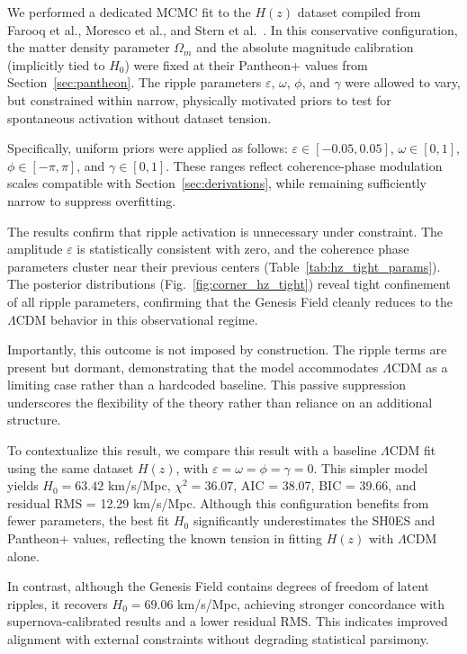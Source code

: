 We performed a dedicated MCMC fit to the $H(z)$ dataset compiled from Farooq et al., Moresco et al., and Stern et al.~\cite{Farooq2017, Moresco2016, Stern2010}. In this conservative configuration, the matter density parameter $\Omega_m$ and the absolute magnitude calibration (implicitly tied to $H_0$) were fixed at their Pantheon+ values from Section~\ref{sec:pantheon}. The ripple parameters $\varepsilon$, $\omega$, $\phi$, and $\gamma$ were allowed to vary, but constrained within narrow, physically motivated priors to test for spontaneous activation without dataset tension.

Specifically, uniform priors were applied as follows: $\varepsilon \in [-0.05, 0.05]$, $\omega \in [0, 1]$, $\phi \in [-\pi, \pi]$, and $\gamma \in [0, 1]$. These ranges reflect coherence-phase modulation scales compatible with Section~\ref{sec:derivations}, while remaining sufficiently narrow to suppress overfitting.

The results confirm that ripple activation is unnecessary under constraint. The amplitude $\varepsilon$ is statistically consistent with zero, and the coherence phase parameters cluster near their previous centers (Table~\ref{tab:hz_tight_params}). The posterior distributions (Fig.~\ref{fig:corner_hz_tight}) reveal tight confinement of all ripple parameters, confirming that the Genesis Field cleanly reduces to the $\Lambda$CDM behavior in this observational regime.

Importantly, this outcome is not imposed by construction. The ripple terms are present but dormant, demonstrating that the model accommodates $\Lambda$CDM as a limiting case rather than a hardcoded baseline. This passive suppression underscores the flexibility of the theory rather than reliance on an additional structure.

To contextualize this result, we compare this result with a baseline $\Lambda$CDM fit using the same dataset $H(z)$, with $\varepsilon = \omega = \phi = \gamma = 0$. This simpler model yields $H_0 = 63.42$ km/s/Mpc, $\chi^2 = 36.07$, AIC = 38.07, BIC = 39.66, and residual RMS = 12.29 km/s/Mpc. Although this configuration benefits from fewer parameters, the best fit $H_0$ significantly underestimates the SH0ES and Pantheon+ values, reflecting the known tension in fitting $H(z)$ with $\Lambda$CDM alone.

In contrast, although the Genesis Field contains degrees of freedom of latent ripples, it recovers $H_0 = 69.06$ km/s/Mpc, achieving stronger concordance with supernova-calibrated results and a lower residual RMS. This indicates improved alignment with external constraints without degrading statistical parsimony.

